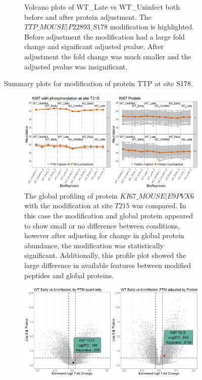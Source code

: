 \documentclass{mcp}
\begin{document}
\begin{figure}[h!]
\begin{subfigure}{\textwidth}
	\caption{Volcano plots of WT\_Late vs WT\_Uninfect both before and after protein adjustment. The $TTP\_MOUSE|P22893\_S178$ modification is highlighted. Before adjustment the modification had a large fold change and significant adjusted pvalue. After adjustment the fold change was much smaller and the adjusted pvalue was insignificant.}
 \end{subfigure}
\caption{Summary plots for modification of protein TTP at site S178.}
\label{fig:No_Diff_Shigella_PTM}
\end{figure}

\begin{figure}[h!]
\centering
 \begin{subfigure}{\textwidth}
 \centering
	\includegraphics[width=.9\textwidth]{sim_new/Difference_Shigella_Profile_Plot}
	\caption{The global profiling of protein $KI67\_MOUSE|E9PVX6$ with the modification at site $T215$ was compared. In this case the modification and global protein appeared to show small or no difference between conditions, however after adjusting for change in global protein abundance, the modification was statistically significant. Additionally, this profile plot showed the large difference in available features between modified peptides and global proteins.}
 \end{subfigure}
 \begin{subfigure}{\textwidth}
 \centering
	\includegraphics[width=.9\textwidth]{sim_new/Difference_Shigella_Volcano}

\end{subfigure}
\end{figure}
\end{document}
